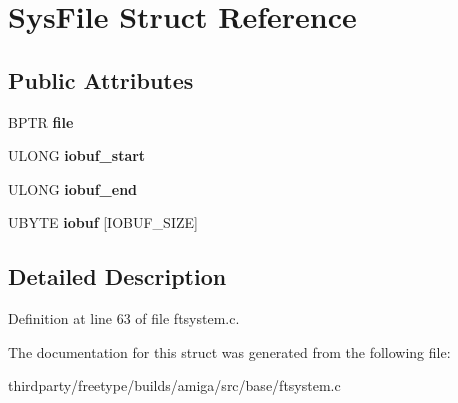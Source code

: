 \hypertarget{struct_sys_file}{}\section{Sys\+File Struct Reference}
\label{struct_sys_file}
\subsection*{Public Attributes}
\begin{DoxyCompactItemize}
\item 
\mbox{\label{struct_sys_file_a53ea6995f454c590ece83620ec6eed16}} 
B\+P\+TR {\bfseries file}
\item 
\mbox{\label{struct_sys_file_ac2ab752e31c800a79f389e6bbbf4353e}} 
U\+L\+O\+NG {\bfseries iobuf\+\_\+start}
\item 
\mbox{\label{struct_sys_file_a2383af4f04a98670cea6d5ed58455262}} 
U\+L\+O\+NG {\bfseries iobuf\+\_\+end}
\item 
\mbox{\label{struct_sys_file_a5c9c152c52b65674e4a122cf48317757}} 
U\+B\+Y\+TE {\bfseries iobuf} \mbox{[}I\+O\+B\+U\+F\+\_\+\+S\+I\+ZE\mbox{]}
\end{DoxyCompactItemize}


\subsection{Detailed Description}


Definition at line 63 of file ftsystem.\+c.



The documentation for this struct was generated from the following file\+:\begin{DoxyCompactItemize}
\item 
thirdparty/freetype/builds/amiga/src/base/ftsystem.\+c\end{DoxyCompactItemize}
